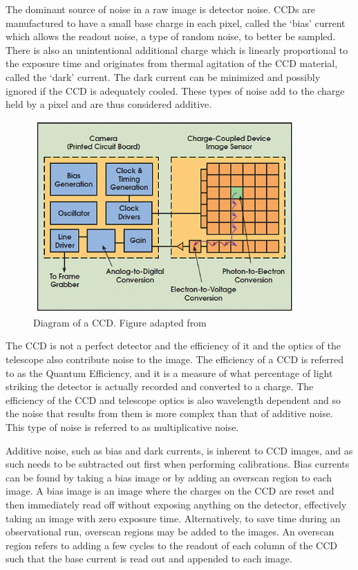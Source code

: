 The dominant source of noise in a raw image is detector noise. \glspl{CCD} are manufactured to have a small base charge in each pixel, called the `bias' current which allows the readout noise, a type of random noise, to better be sampled. There is also an unintentional additional charge which is linearly proportional to the exposure time and originates from thermal agitation of the \gls{CCD} material, called the `dark' current. The dark current can be minimized and possibly ignored if the \gls{CCD} is adequately cooled. These types of noise add to the charge held by a pixel and are thus considered additive.
\prgph

\begin{figure}[t]
    \centering
    \includegraphics[width = 10cm]{figures/2_ccd.jpg}
    \caption{Diagram of a \gls{CCD}. Figure adapted from \citep{ccd_fig}}
    \label{fig:ccd_diagram}
\end{figure}


The \gls{CCD} is not a perfect detector and the efficiency of it and the optics of the telescope also contribute noise to the image. The efficiency of a \gls{CCD} is referred to as the Quantum Efficiency, and it is a measure of what percentage of light striking the detector is actually recorded and converted to a charge. The efficiency of the \gls{CCD} and telescope optics is also wavelength dependent and so the noise that results from them is more complex than that of additive noise. This type of noise is referred to as multiplicative noise.
\prgph

Additive noise, such as bias and dark currents, is inherent to \gls{CCD} images, and as such needs to be subtracted out first when performing calibrations. Bias currents can be found by taking a bias image or by adding an overscan region to each image. A bias image is an image where the charges on the \gls{CCD} are reset and then immediately read off without exposing anything on the detector, effectively taking an image with zero exposure time. Alternatively, to save time during an observational run, overscan regions may be added to the images. An overscan region refers to adding a few cycles to the readout of each column of the \gls{CCD} such that the base current is read out and appended to each image.
\prgph

